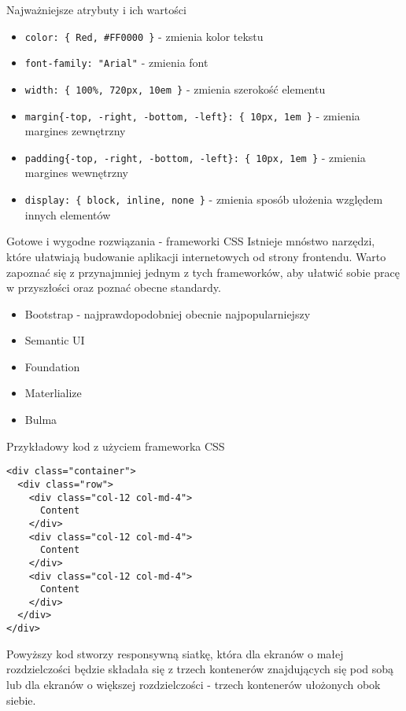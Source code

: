 \begin{frame}{Najważniejsze atrybuty i ich wartości}	
	\begin{itemize}
		\item \texttt{color: \{ Red, \#FF0000 \}} - zmienia kolor tekstu
		\item \texttt{font-family: "Arial"} - zmienia font
		\item \texttt{width: \{ 100\%, 720px, 10em \}} - zmienia szerokość elementu
		\item \texttt{margin\{-top, -right, -bottom, -left\}: \{ 10px, 1em \}} - zmienia margines zewnętrzny
		\item \texttt{padding\{-top, -right, -bottom, -left\}: \{ 10px, 1em \}} - zmienia margines wewnętrzny
		\item \texttt{display: \{ block, inline, none \}} - zmienia sposób ułożenia względem innych elementów
	\end{itemize}
\end{frame}

\begin{frame}{Gotowe i wygodne rozwiązania - frameworki CSS}
	Istnieje mnóstwo narzędzi, które ułatwiają budowanie aplikacji internetowych od strony frontendu. Warto zapoznać się z przynajmniej jednym z tych frameworków, aby ułatwić sobie pracę w przyszłości oraz poznać obecne standardy.
	
	\begin{itemize}
		\item Bootstrap - najprawdopodobniej obecnie najpopularniejszy
		\item Semantic UI
		\item Foundation
		\item Materlialize
		\item Bulma
	\end{itemize}
\end{frame}

\begin{frame}[fragile]{Przykładowy kod z użyciem frameworka CSS}
	\begin{lstlisting}
<div class="container">
  <div class="row">
    <div class="col-12 col-md-4">
      Content
    </div>
    <div class="col-12 col-md-4">
      Content
    </div>
    <div class="col-12 col-md-4">
      Content
    </div>
  </div>
</div>
	\end{lstlisting}
	
	Powyższy kod stworzy responsywną siatkę, która dla ekranów o małej rozdzielczości będzie składała się z trzech kontenerów znajdujących się pod sobą lub dla ekranów o większej rozdzielczości - trzech kontenerów ułożonych obok siebie.
\end{frame}

